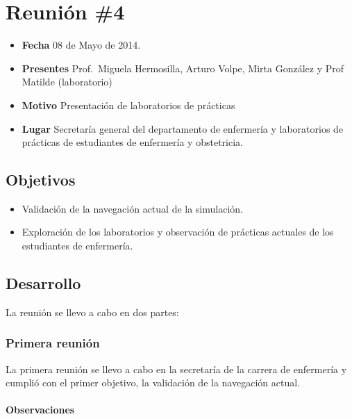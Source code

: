 \section{Reunión \#4}\label{reuniuxf3n-4}

\begin{itemize}
\itemsep1pt\parskip0pt
\item
  \textbf{Fecha} 08 de Mayo de 2014.
\item
  \textbf{Presentes} Prof.~Miguela Hermosilla, Arturo Volpe, Mirta
  González y Prof Matilde (laboratorio)
\item
  \textbf{Motivo} Presentación de laboratorios de prácticas
\item
  \textbf{Lugar} Secretaría general del departamento de enfermería y
  laboratorios de prácticas de estudiantes de enfermería y obstetricia.
\end{itemize}

\subsection{Objetivos}\label{objetivos}

\begin{itemize}
\itemsep1pt\parskip0pt
\item
  Validación de la navegación actual de la simulación.
\item
  Exploración de los laboratorios y observación de prácticas actuales de
  los estudiantes de enfermería.
\end{itemize}

\subsection{Desarrollo}\label{desarrollo}

La reunión se llevo a cabo en dos partes:

\subsubsection{Primera reunión}\label{primera-reuniuxf3n}

La primera reunión se llevo a cabo en la secretaría de la carrera de
enfermería y cumplió con el primer objetivo, la validación de la
navegación actual.

\paragraph{Observaciones}\label{observaciones}

